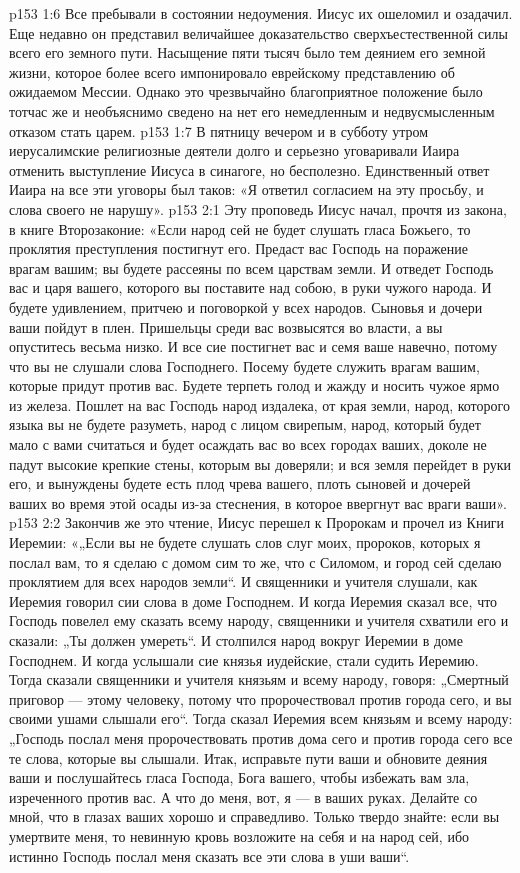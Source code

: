 \vs p153 1:6 Все пребывали в состоянии недоумения. Иисус их ошеломил и озадачил. Еще недавно он представил величайшее доказательство сверхъестественной силы всего его земного пути. Насыщение пяти тысяч было тем деянием его земной жизни, которое более всего импонировало еврейскому представлению об ожидаемом Мессии. Однако это чрезвычайно благоприятное положение было тотчас же и необъяснимо сведено на нет его немедленным и недвусмысленным отказом стать царем.
\vs p153 1:7 В пятницу вечером и в субботу утром иерусалимские религиозные деятели долго и серьезно уговаривали Иаира отменить выступление Иисуса в синагоге, но бесполезно. Единственный ответ Иаира на все эти уговоры был таков: «Я ответил согласием на эту просьбу, и слова своего не нарушу».
\vs p153 2:1 Эту проповедь Иисус начал, прочтя из закона, в книге Второзаконие: «Если народ сей не будет слушать гласа Божьего, то проклятия преступления постигнут его. Предаст вас Господь на поражение врагам вашим; вы будете рассеяны по всем царствам земли. И отведет Господь вас и царя вашего, которого вы поставите над собою, в руки чужого народа. И будете удивлением, притчею и поговоркой у всех народов. Сыновья и дочери ваши пойдут в плен. Пришельцы среди вас возвысятся во власти, а вы опуститесь весьма низко. И все сие постигнет вас и семя ваше навечно, потому что вы не слушали слова Господнего. Посему будете служить врагам вашим, которые придут против вас. Будете терпеть голод и жажду и носить чужое ярмо из железа. Пошлет на вас Господь народ издалека, от края земли, народ, которого языка вы не будете разуметь, народ с лицом свирепым, народ, который будет мало с вами считаться и будет осаждать вас во всех городах ваших, доколе не падут высокие крепкие стены, которым вы доверяли; и вся земля перейдет в руки его, и вынуждены будете есть плод чрева вашего, плоть сыновей и дочерей ваших во время этой осады из\hyp{}за стеснения, в которое ввергнут вас враги ваши».
\vs p153 2:2 Закончив же это чтение, Иисус перешел к Пророкам и прочел из Книги Иеремии: «„Если вы не будете слушать слов слуг моих, пророков, которых я послал вам, то я сделаю с домом сим то же, что с Силомом, и город сей сделаю проклятием для всех народов земли“. И священники и учителя слушали, как Иеремия говорил сии слова в доме Господнем. И когда Иеремия сказал все, что Господь повелел ему сказать всему народу, священники и учителя схватили его и сказали: „Ты должен умереть“. И столпился народ вокруг Иеремии в доме Господнем. И когда услышали сие князья иудейские, стали судить Иеремию. Тогда сказали священники и учителя князьям и всему народу, говоря: „Смертный приговор --- этому человеку, потому что пророчествовал против города сего, и вы своими ушами слышали его“. Тогда сказал Иеремия всем князьям и всему народу: „Господь послал меня пророчествовать против дома сего и против города сего все те слова, которые вы слышали. Итак, исправьте пути ваши и обновите деяния ваши и послушайтесь гласа Господа, Бога вашего, чтобы избежать вам зла, изреченного против вас. А что до меня, вот, я --- в ваших руках. Делайте со мной, что в глазах ваших хорошо и справедливо. Только твердо знайте: если вы умертвите меня, то невинную кровь возложите на себя и на народ сей, ибо истинно Господь послал меня сказать все эти слова в уши ваши“.
